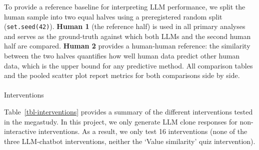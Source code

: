 \documentclass[
  letterpaper,
  DIV=11,
  numbers=noendperiod]{scrartcl}
\makeatletter
\let\oldparagraph\paragraph
\renewcommand{\paragraph}{
    \@ifstar
      \xxxParagraphStar
      \xxxParagraphNoStar
  }
\newcommand{\xxxParagraphStar}[1]{\oldparagraph*{#1}\mbox{}}
\newcommand{\xxxParagraphNoStar}[1]{\oldparagraph{#1}\mbox{}}
\makeatother
\begin{document}
To provide a reference baseline for interpreting LLM performance, we
split the human sample into two equal halves using a preregistered
random split (\texttt{set.seed(42)}). \textbf{Human 1} (the reference
half) is used in all primary analyses and serves as the ground-truth
against which both LLMs and the second human half are compared.
\textbf{Human 2} provides a human-human reference: the similarity
between the two halves quantifies how well human data predict other
human data, which is the upper bound for any predictive method. All
comparison tables and the pooled scatter plot report metrics for both
comparisons side by side.

\paragraph{Interventions}\label{interventions}

Table~\ref{tbl-interventions} provides a summary of the different
interventions tested in the megastudy. In this project, we only generate
LLM clone responses for non-interactive interventions. As a result, we
only test 16 interventions (none of the three LLM-chatbot interventions,
neither the `Value similarity' quiz intervention).
\end{document}
